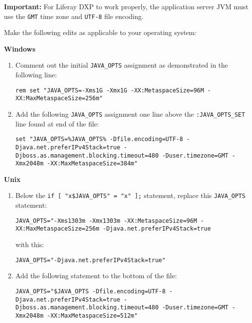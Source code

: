 \noindent\hrulefill

\textbf{Important:} For Liferay DXP to work properly, the application
server JVM must use the \texttt{GMT} time zone and \texttt{UTF-8} file
encoding.

\noindent\hrulefill

Make the following edits as applicable to your operating system:

\textbf{Windows}

\begin{enumerate}
\def\labelenumi{\arabic{enumi}.}
\item
  Comment out the initial \texttt{JAVA\_OPTS} assignment as demonstrated
  in the following line:

\begin{verbatim}
rem set "JAVA_OPTS=-Xms1G -Xmx1G -XX:MetaspaceSize=96M -XX:MaxMetaspaceSize=256m"
\end{verbatim}
\item
  Add the following \texttt{JAVA\_OPTS} assignment one line above the
  \texttt{:JAVA\_OPTS\_SET} line found at end of the file:

\begin{verbatim}
set "JAVA_OPTS=%JAVA_OPTS% -Dfile.encoding=UTF-8 -Djava.net.preferIPv4Stack=true -Djboss.as.management.blocking.timeout=480 -Duser.timezone=GMT -Xmx2048m -XX:MaxMetaspaceSize=384m"
\end{verbatim}
\end{enumerate}

\textbf{Unix}

\begin{enumerate}
\def\labelenumi{\arabic{enumi}.}
\item
  Below the \texttt{if\ {[}\ "x\$JAVA\_OPTS"\ =\ "x"\ {]};} statement,
  replace this \texttt{JAVA\_OPTS} statement:

\begin{verbatim}
JAVA_OPTS="-Xms1303m -Xmx1303m -XX:MetaspaceSize=96M -XX:MaxMetaspaceSize=256m -Djava.net.preferIPv4Stack=true
\end{verbatim}

  with this:

\begin{verbatim}
JAVA_OPTS="-Djava.net.preferIPv4Stack=true"
\end{verbatim}
\item
  Add the following statement to the bottom of the file:

\begin{verbatim}
JAVA_OPTS="$JAVA_OPTS -Dfile.encoding=UTF-8 -Djava.net.preferIPv4Stack=true -Djboss.as.management.blocking.timeout=480 -Duser.timezone=GMT -Xmx2048m -XX:MaxMetaspaceSize=512m"
\end{verbatim}
\end{enumerate}

